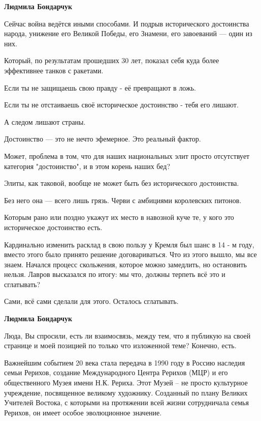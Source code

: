 \begin{itemize}
\begin{itemize}
\textbf{Людмила Бондарчук} 

Сейчас война ведётся иными способами. И подрыв исторического достоинства
народа, унижение его Великой Победы, его Знамени, его завоеваний — один из них.

Который, по результатам прошедших 30 лет, показал себя куда более эффективнее танков с ракетами.

Если ты не защищаешь свою правду - её превращают в ложь.

Если ты не отстаиваешь своё историческое достоинство - тебя его лишают.

А следом лишают страны.

Достоинство — это не нечто эфемерное. Это реальный фактор.

Может, проблема в том, что для наших национальных элит просто отсутствует
категория "достоинство", и в этом корень наших бед?

Элиты, как таковой, вообще не может быть без исторического достоинства.

Без него она — всего лишь грязь. Черви с амбициями королевских питонов.

Которым рано или поздно укажут их место в навозной куче те, у кого это историческое достоинство есть.

Кардинально изменить расклад в свою пользу у Кремля был шанс в 14 - м году,
вместо этого было принято решение договариваться. Что из этого вышло, мы все
знаем. Начался процесс скольжения, которое можно замедлить, но остановить
нельзя. Лавров высказался по итогу: мы что, должны терпеть всё это и
сглатывать?

Сами, всё сами сделали для этого. Осталось сглатывать.

 
\textbf{Людмила Бондарчук} 

Люда, Вы спросили, есть ли взаимосвязь, между тем, что я публикую на своей
странице и моей позицией по только что изложенной теме? Конечно, есть.

Важнейшим событием 20 века стала передача в 1990 году в Россию наследия семьи
Рерихов, создание Международного Центра Рерихов (МЦР) и его общественного Музея
имени Н.К. Рериха. Этот Музей – не просто культурное учреждение, посвященное
великому художнику. Созданный по плану Великих Учителей Востока, с которыми на
протяжении всей жизни сотрудничала семья Рерихов, он имеет особое эволюционное
значение.


\end{itemize}
\end{itemize}
